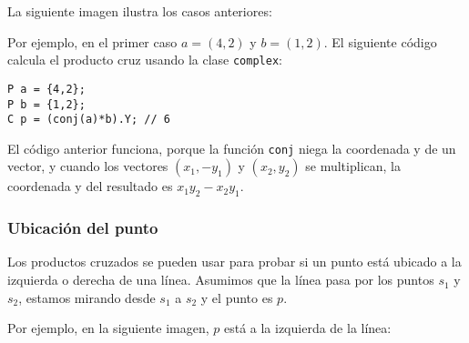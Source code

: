 La siguiente imagen ilustra los casos anteriores:
\begin{center}
\end{center}

\noindent
Por ejemplo, en el primer caso
$a=(4,2)$ y $b=(1,2)$.
El siguiente código calcula el producto cruz
usando la clase \texttt{complex}:

\begin{lstlisting}
P a = {4,2};
P b = {1,2};
C p = (conj(a)*b).Y; // 6
\end{lstlisting}

El código anterior funciona, porque
la función \texttt{conj} niega la coordenada y
de un vector,
y cuando los vectores $(x_1,-y_1)$ y $(x_2,y_2)$
se multiplican, la coordenada y
del resultado es $x_1 y_2 - x_2 y_1$.

\subsubsection{Ubicación del punto}

Los productos cruzados se pueden usar para probar
si un punto está ubicado a la izquierda o derecha
de una línea.
Asumimos que la línea pasa por los puntos
$s_1$ y $s_2$, estamos mirando desde $s_1$
a $s_2$ y el punto es $p$.

Por ejemplo, en la siguiente imagen,
$p$ está a la izquierda de la línea:
\begin{center}
\end{center}


